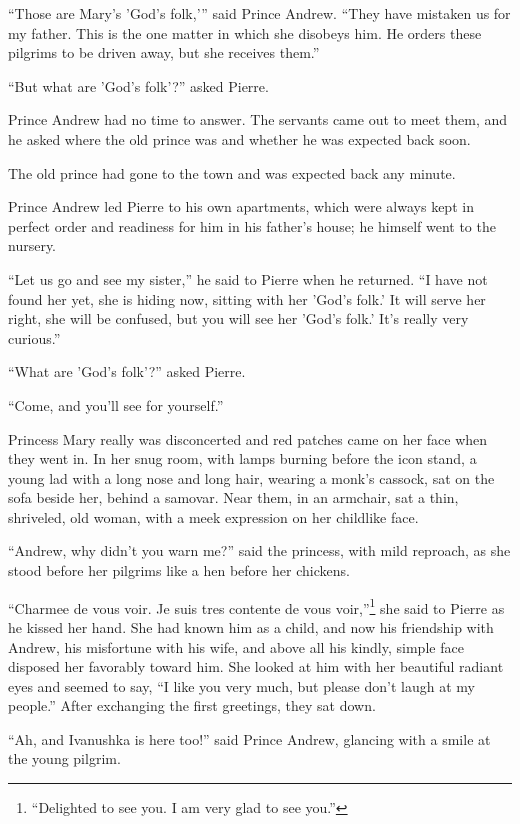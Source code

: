 ``Those are Mary's 'God's folk,'{}'' said Prince Andrew. ``They
have mistaken us for my father. This is the one matter in which
she disobeys him. He orders these pilgrims to be driven away, but
she receives them.''

``But what are 'God's folk'?'' asked Pierre.

Prince Andrew had no time to answer. The servants came out to
meet them, and he asked where the old prince was and whether he
was expected back soon.

The old prince had gone to the town and was expected back any
minute.

Prince Andrew led Pierre to his own apartments, which were always
kept in perfect order and readiness for him in his father's
house; he himself went to the nursery.

``Let us go and see my sister,'' he said to Pierre when he
returned. ``I have not found her yet, she is hiding now, sitting
with her 'God's folk.' It will serve her right, she will be
confused, but you will see her 'God's folk.' It's really very
curious.''

``What are 'God's folk'?'' asked Pierre.

``Come, and you'll see for yourself.''

Princess Mary really was disconcerted and red patches came on her
face when they went in. In her snug room, with lamps burning
before the icon stand, a young lad with a long nose and long
hair, wearing a monk's cassock, sat on the sofa beside her,
behind a samovar. Near them, in an armchair, sat a thin,
shriveled, old woman, with a meek expression on her childlike
face.

``Andrew, why didn't you warn me?'' said the princess, with mild
reproach, as she stood before her pilgrims like a hen before her
chickens.

``Charmee de vous voir. Je suis tres contente de vous
voir,''\footnote{``Delighted to see you. I am very glad to see
you.''} she said to Pierre as he kissed her hand. She had known
him as a child, and now his friendship with Andrew, his
misfortune with his wife, and above all his kindly, simple face
disposed her favorably toward him. She looked at him with her
beautiful radiant eyes and seemed to say, ``I like you very much,
but please don't laugh at my people.'' After exchanging the first
greetings, they sat down.

``Ah, and Ivanushka is here too!'' said Prince Andrew, glancing
with a smile at the young pilgrim.

